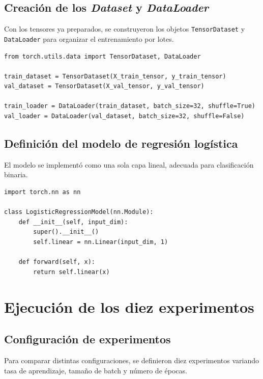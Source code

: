 \documentclass[conference]{IEEEtran}
\begin{document}
\subsection{Creación de los \textit{Dataset} y \textit{DataLoader}}

Con los tensores ya preparados, se construyeron los objetos \texttt{TensorDataset} y \texttt{DataLoader} para organizar el entrenamiento por lotes.

\begin{lstlisting}[caption={Creación de TensorDataset y DataLoader}, label={lst:dataloaders}]
from torch.utils.data import TensorDataset, DataLoader

train_dataset = TensorDataset(X_train_tensor, y_train_tensor)
val_dataset = TensorDataset(X_val_tensor, y_val_tensor)

train_loader = DataLoader(train_dataset, batch_size=32, shuffle=True)
val_loader = DataLoader(val_dataset, batch_size=32, shuffle=False)
\end{lstlisting}

\subsection{Definición del modelo de regresión logística}

El modelo se implementó como una sola capa lineal, adecuada para clasificación binaria.

\begin{lstlisting}[caption={Definición del modelo de regresión logística en PyTorch}, label={lst:modelo}]
import torch.nn as nn

class LogisticRegressionModel(nn.Module):
    def __init__(self, input_dim):
        super().__init__()
        self.linear = nn.Linear(input_dim, 1)

    def forward(self, x):
        return self.linear(x)
\end{lstlisting}

\section{Ejecución de los diez experimentos}

\subsection{Configuración de experimentos}

Para comparar distintas configuraciones, se definieron diez experimentos variando tasa de aprendizaje, tamaño de batch y número de épocas.
\end{document}
